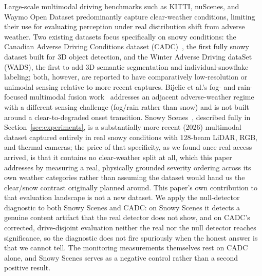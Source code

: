 Large-scale multimodal driving benchmarks such as KITTI, nuScenes, and Waymo Open Dataset predominantly capture clear-weather conditions, limiting their use for evaluating perception under real distribution shift from adverse weather. Two existing datasets focus specifically on snowy conditions: the Canadian Adverse Driving Conditions dataset (CADC)~\cite{Pitropov2021CADC}, the first fully snowy dataset built for 3D object detection, and the Winter Adverse Driving dataSet (WADS), the first to add 3D semantic segmentation and individual-snowflake labeling; both, however, are reported to have comparatively low-resolution or unimodal sensing relative to more recent captures. Bijelic et al.'s fog- and rain-focused multimodal fusion work~\cite{Bijelic2020SeeingThroughFog} addresses an adjacent adverse-weather regime with a different sensing challenge (fog/rain rather than snow) and is not built around a clear-to-degraded onset transition. Snowy Scenes~\cite{SnowyScenes2026}, described fully in Section~\ref{sec:experiments}, is a substantially more recent (2026) multimodal dataset captured entirely in real snowy conditions with 128-beam LiDAR, RGB, and thermal cameras; the price of that specificity, as we found once real access arrived, is that it contains no clear-weather split at all, which this paper addresses by measuring a real, physically grounded severity ordering across its own weather categories rather than assuming the dataset would hand us the clear/snow contrast originally planned around. This paper's own contribution to that evaluation landscape is not a new dataset. We apply the null-detector diagnostic to both Snowy Scenes and CADC: on Snowy Scenes it detects a genuine content artifact that the real detector does not show, and on CADC's corrected, drive-disjoint evaluation neither the real nor the null detector reaches significance, so the diagnostic does not fire spuriously when the honest answer is that we cannot tell. The monitoring measurements themselves rest on CADC alone, and Snowy Scenes serves as a negative control rather than a second positive result.
